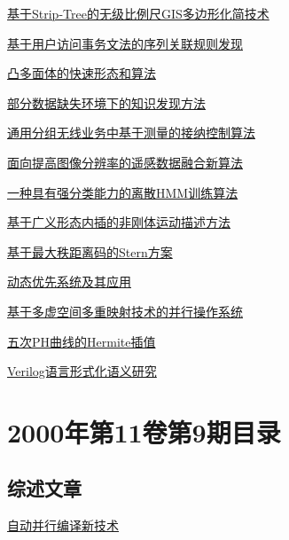 \documentclass[a4paper]{article}
\begin{document}
\href{http://www.jos.org.cn/ch/reader/download_pdf.aspx?file_no=20011008&year_id=2001&quarter_id=10&falg=1}{基于Strip-Tree的无级比例尺GIS多边形化简技术}

\href{http://www.jos.org.cn/ch/reader/download_pdf.aspx?file_no=20011009&year_id=2001&quarter_id=10&falg=1}{基于用户访问事务文法的序列关联规则发现}

\href{http://www.jos.org.cn/ch/reader/download_pdf.aspx?file_no=20011010&year_id=2001&quarter_id=10&falg=1}{凸多面体的快速形态和算法}

\href{http://www.jos.org.cn/ch/reader/download_pdf.aspx?file_no=20011011&year_id=2001&quarter_id=10&falg=1}{部分数据缺失环境下的知识发现方法}

\href{http://www.jos.org.cn/ch/reader/download_pdf.aspx?file_no=20011012&year_id=2001&quarter_id=10&falg=1}{通用分组无线业务中基于测量的接纳控制算法}

\href{http://www.jos.org.cn/ch/reader/download_pdf.aspx?file_no=20011013&year_id=2001&quarter_id=10&falg=1}{面向提高图像分辨率的遥感数据融合新算法}

\href{http://www.jos.org.cn/ch/reader/download_pdf.aspx?file_no=20011014&year_id=2001&quarter_id=10&falg=1}{一种具有强分类能力的离散HMM训练算法}

\href{http://www.jos.org.cn/ch/reader/download_pdf.aspx?file_no=20011015&year_id=2001&quarter_id=10&falg=1}{基于广义形态内插的非刚体运动描述方法}

\href{http://www.jos.org.cn/ch/reader/download_pdf.aspx?file_no=20011016&year_id=2001&quarter_id=10&falg=1}{基于最大秩距离码的Stern方案}

\href{http://www.jos.org.cn/ch/reader/download_pdf.aspx?file_no=20011017&year_id=2001&quarter_id=10&falg=1}{动态优先系统及其应用}

\href{http://www.jos.org.cn/ch/reader/download_pdf.aspx?file_no=20011018&year_id=2001&quarter_id=10&falg=1}{基于多虚空间多重映射技术的并行操作系统}

\href{http://www.jos.org.cn/ch/reader/download_pdf.aspx?file_no=20011019&year_id=2001&quarter_id=10&falg=1}{五次PH曲线的Hermite插值}

\href{http://www.jos.org.cn/ch/reader/download_pdf.aspx?file_no=20011020&year_id=2001&quarter_id=10&falg=1}{Verilog语言形式化语义研究}


\section{\textbf{2000年第11卷第9期目录}}
\subsection{综述文章}
\href{http://www.jos.org.cn/ch/reader/download_pdf.aspx?file_no=20000921&year_id=2000&quarter_id=9&falg=1}{自动并行编译新技术}
\end{document}
